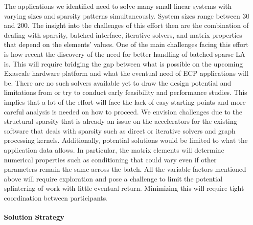 The applications we identified need to solve many small linear systems
with varying sizes and sparsity patterns simultaneously.  System sizes
range between 30 and 200. The insight into the challenges of this effort
then are the combination of dealing with sparsity, batched interface,
iterative solvers, and matrix properties that depend on the elements'
values.
One of the main challenges facing this effort is how recent the
discovery of the need for better handling of batched sparse LA is. This
will require bridging the gap between what is possible on the upcoming
Exascale hardware platform and what the eventual need of ECP
applications will be.
There are no such solvers available yet to draw the design potential and
limitations from or try to conduct early feasibility and performance
studies. This implies that a lot of the effort will face the lack of
easy starting points and more careful analysis is needed on how to proceed.
We envision challenges due to the structural sparsity that is already an
issue on the accelerators for the existing software that deals with
sparsity such as direct or iterative solvers and graph processing
kernels.
Additionally, potential solutions would be limited to what the application
data allows. In particular, the matrix elements will determine numerical
properties such as conditioning that could vary even if other parameters
remain the same across the batch.
All the variable factors mentioned above will require exploration and
pose a challenge to limit the potential splintering of work with little
eventual return. Minimizing this will require tight coordination between
participants.

\paragraph{Solution Strategy}


